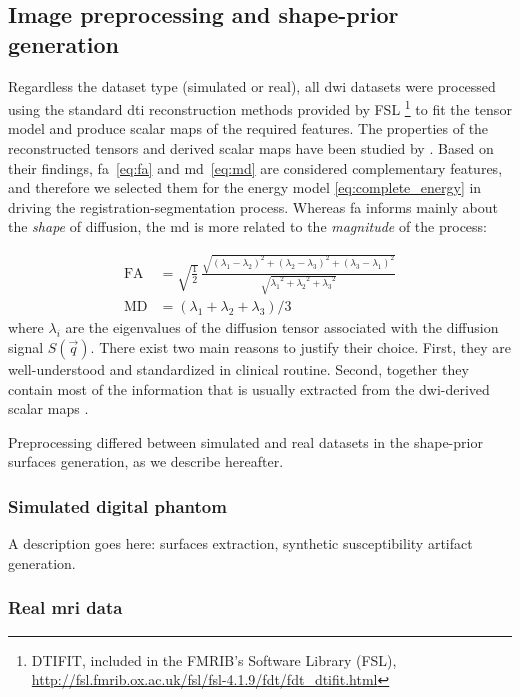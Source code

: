 \subsection{Image preprocessing and shape-prior generation}
\label{sec:preprocessing}
%
Regardless the dataset type (simulated or real), all \gls{dwi} datasets were processed
using the standard \gls{dti} reconstruction methods provided by FSL \footnote{DTIFIT,
included in the FMRIB's Software Library (FSL),
\url{http://fsl.fmrib.ox.ac.uk/fsl/fsl-4.1.9/fdt/fdt_dtifit.html}} to fit
the tensor model and produce scalar maps of the required features.
The properties of the reconstructed tensors and derived scalar maps have
been studied by \cite{ennis_orthogonal_2006}. Based on their
findings, \gls{fa}~\eqref{eq:fa} and \gls{md}~\eqref{eq:md} are
considered complementary features, and therefore we selected them for the
energy model \eqref{eq:complete_energy} in driving the
registration-segmentation process.
Whereas \gls{fa} informs mainly about the \emph{shape} of diffusion,
the \gls{md} is more related to the \emph{magnitude} of the process:

\begin{align}
\mathrm{FA} &= \sqrt{ \frac{1}{2}}\,\frac{\sqrt{ (\lambda_1 - \lambda_2)^2 + (\lambda_2 - \lambda_3)^2 + (\lambda_3 - \lambda_1)^2}}{\sqrt{ {\lambda_1}^2 + {\lambda_2}^2 + {\lambda_3}^2}} \label{eq:fa} \\
\mathrm{MD} &= ( \lambda_1 + \lambda_2 + \lambda_3 ) / 3 \label{eq:md}
\end{align}
where $\lambda_i$ are the eigenvalues of the diffusion tensor
associated with the diffusion signal $S(\vec{q})$. There exist
two main reasons to justify their choice.
First, they are well-understood and standardized in clinical routine.
Second, together they contain most of the information that is
usually extracted from the \gls{dwi}-derived scalar maps
\cite{ennis_orthogonal_2006}.


Preprocessing differed between simulated and real datasets in the
shape-prior surfaces generation, as we describe hereafter.


\subsubsection{Simulated digital phantom} %
A description goes here: surfaces extraction, synthetic susceptibility artifact generation.

\subsubsection {Real \gls{mri} data} %

